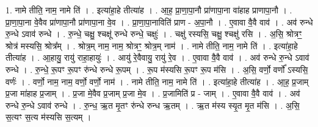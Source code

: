 \documentclass[17pt]{extarticle}
\begin{document}
1. नामे तीति॒ नाम॒ नामे ति॑ । . इत्या॑हा॒हे तीत्या॑ह । . आ॒ह॒ प्रा॒णा॒पा॒नौ प्रा॑णापा॒ना वा॑हाह प्राणापा॒नौ । . प्रा॒णा॒पा॒ना वे॒वैव प्रा॑णापा॒नौ प्रा॑णापा॒ना वे॒व । . प्रा॒णा॒पा॒नाविति॑ प्राण - अ॒पा॒नौ । . ए॒वावा वै॒वै वाव॑ । . अव॑ रुन्धे रु॒न्धे ऽवाव॑ रुन्धे । . रु॒न्धे॒ चक्षु॒ श्चक्षू॑ रुन्धे रुन्धे॒ चक्षुः॑ । . चक्षु॑ रस्यसि॒ चक्षु॒ श्चक्षु॑ रसि । . अ॒सि॒ श्रोत्रꣳ॒॒ श्रोत्र॑ मस्यसि॒ श्रोत्र᳚म् । . श्रोत्र॒म् नाम॒ नाम॒ श्रोत्रꣳ॒॒ श्रोत्र॒म् नाम॑ । . नामे तीति॒ नाम॒ नामे ति॑ । . इत्या॑हा॒हे तीत्या॑ह । . आ॒हायु॒ रायु॑ राहा॒हायुः॑ । . आयु॑ रे॒वैवायु॒ रायु॑ रे॒व । . ए॒वावा वै॒वै वाव॑ । . अव॑ रुन्धे रु॒न्धे ऽवाव॑ रुन्धे । . रु॒न्धे॒ रू॒पꣳ रू॒पꣳ रु॑न्धे रुन्धे रू॒पम् । . रू॒प म॑स्यसि रू॒पꣳ रू॒प म॑सि । . अ॒सि॒ वर्णो॒ वर्णो᳚ ऽस्यसि॒ वर्णः॑ । . वर्णो॒ नाम॒ नाम॒ वर्णो॒ वर्णो॒ नाम॑ । . नामे तीति॒ नाम॒ नामे ति॑ । . इत्या॑हा॒हे तीत्या॑ह । . आ॒ह॒ प्र॒जाम् प्र॒जा मा॑हाह प्र॒जाम् । . प्र॒जा मे॒वैव प्र॒जाम् प्र॒जा मे॒व । . प्र॒जामिति॑ प्र - जाम् । . ए॒वावा वै॒वै वाव॑ । . अव॑ रुन्धे रु॒न्धे ऽवाव॑ रुन्धे । . रु॒न्ध॒ ऋ॒त मृ॒तꣳ रु॑न्धे रुन्ध ऋ॒तम् । . ऋ॒त म॑स्य स्यृ॒त मृ॒त म॑सि । . अ॒सि॒ स॒त्यꣳ स॒त्य म॑स्यसि स॒त्यम् । \newline
\end{document}
